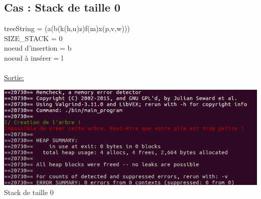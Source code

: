 \documentclass[a4paper]{article}
\begin{document}
\subsection{Cas : Stack de taille 0}
treeString = (a(b(k(h,u)z)f(m)x(p,v,w)))
\\ 
SIZE\_STACK = 0
\\
noeud d'insertion = b
\\
noeud à insérer = l
\\
\\
\underline{Sortie: }
\begin{center}
\includegraphics[scale=0.6]{stack_0.png}
\\
Stack de taille 0
\end{center}
\end{document}
